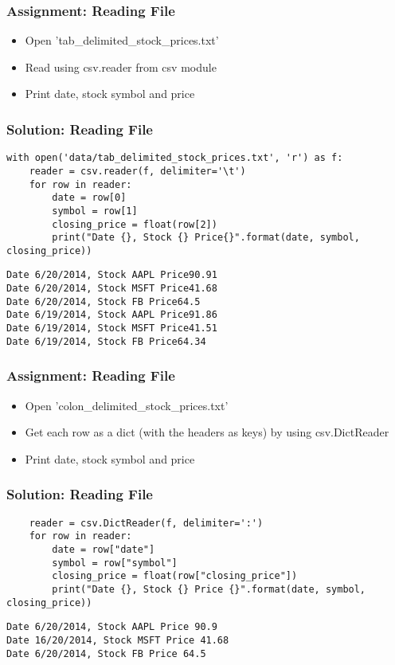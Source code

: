 \begin{frame}[fragile]\frametitle{Assignment: Reading File}
\begin{itemize}
\item Open 'tab\_delimited\_stock\_prices.txt'
\item Read using csv.reader from csv module
\item Print date, stock symbol and price
\end{itemize}
\end{frame}


\begin{frame}[fragile]\frametitle{Solution: Reading File}
\begin{lstlisting}
with open('data/tab_delimited_stock_prices.txt', 'r') as f:
    reader = csv.reader(f, delimiter='\t')
    for row in reader:
        date = row[0]
        symbol = row[1]
        closing_price = float(row[2])
        print("Date {}, Stock {} Price{}".format(date, symbol, closing_price))
\end{lstlisting}

\begin{lstlisting}
Date 6/20/2014, Stock AAPL Price90.91
Date 6/20/2014, Stock MSFT Price41.68
Date 6/20/2014, Stock FB Price64.5
Date 6/19/2014, Stock AAPL Price91.86
Date 6/19/2014, Stock MSFT Price41.51
Date 6/19/2014, Stock FB Price64.34
\end{lstlisting}
\end{frame}

\begin{frame}[fragile]\frametitle{Assignment: Reading File}
\begin{itemize}
\item Open 'colon\_delimited\_stock\_prices.txt'
\item Get each row as a  dict  (with the headers as keys) by using  csv.DictReader
\item Print date, stock symbol and price
\end{itemize}
\end{frame}


\begin{frame}[fragile]\frametitle{Solution: Reading File}
\begin{lstlisting}
    reader = csv.DictReader(f, delimiter=':')
    for row in reader:
        date = row["date"]
        symbol = row["symbol"]
        closing_price = float(row["closing_price"])
        print("Date {}, Stock {} Price {}".format(date, symbol, closing_price))
\end{lstlisting}
\begin{lstlisting}
Date 6/20/2014, Stock AAPL Price 90.9
Date 16/20/2014, Stock MSFT Price 41.68
Date 6/20/2014, Stock FB Price 64.5
\end{lstlisting}
\end{frame}


